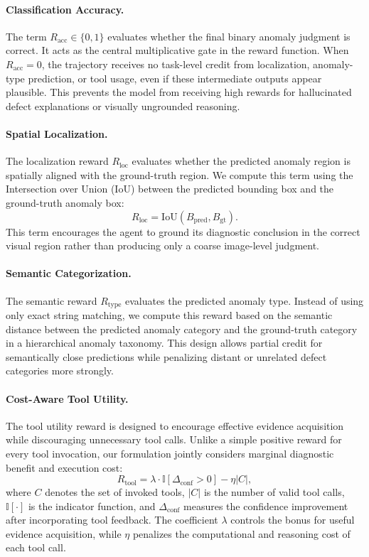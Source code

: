 \documentclass{llmxive}
\begin{document}
{\paragraph{Classification Accuracy.}
The term $R_{\text{acc}} \in \{0,1\}$ evaluates whether the final binary anomaly judgment is correct. 
It acts as the central multiplicative gate in the reward function. 
When $R_{\text{acc}}=0$, the trajectory receives no task-level credit from localization, anomaly-type prediction, or tool usage, even if these intermediate outputs appear plausible. 
This prevents the model from receiving high rewards for hallucinated defect explanations or visually ungrounded reasoning.

\paragraph{Spatial Localization.}
The localization reward $R_{\text{loc}}$ evaluates whether the predicted anomaly region is spatially aligned with the ground-truth region. 
We compute this term using the Intersection over Union (IoU) between the predicted bounding box and the ground-truth anomaly box:
\begin{equation}
R_{\text{loc}} = \text{IoU}(B_{\text{pred}}, B_{\text{gt}}).
\end{equation}
This term encourages the agent to ground its diagnostic conclusion in the correct visual region rather than producing only a coarse image-level judgment.

\paragraph{Semantic Categorization.}
The semantic reward $R_{\text{type}}$ evaluates the predicted anomaly type. 
Instead of using only exact string matching, we compute this reward based on the semantic distance between the predicted anomaly category and the ground-truth category in a hierarchical anomaly taxonomy. 
This design allows partial credit for semantically close predictions while penalizing distant or unrelated defect categories more strongly.

\paragraph{Cost-Aware Tool Utility.}
The tool utility reward is designed to encourage effective evidence acquisition while discouraging unnecessary tool calls. 
Unlike a simple positive reward for every tool invocation, our formulation jointly considers marginal diagnostic benefit and execution cost:
\begin{equation}
R_{\text{tool}} =
\lambda \cdot \mathbb{I}[\Delta_{\text{conf}} > 0]
-
\eta |C|,
\end{equation}
where $C$ denotes the set of invoked tools, $|C|$ is the number of valid tool calls, $\mathbb{I}[\cdot]$ is the indicator function, and $\Delta_{\text{conf}}$ measures the confidence improvement after incorporating tool feedback. 
The coefficient $\lambda$ controls the bonus for useful evidence acquisition, while $\eta$ penalizes the computational and reasoning cost of each tool call.

}
\end{document}
